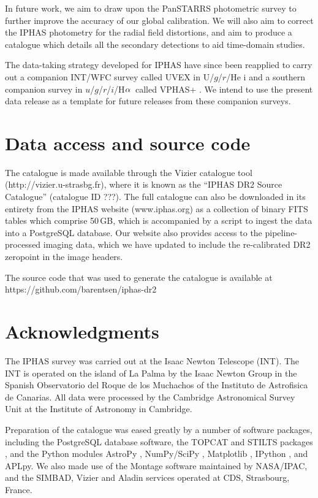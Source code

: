 \documentclass[useAMS,usenatbib]{mn2e}
\def\ha{\mbox{H$\rm \alpha$}}
\begin{document}
In future work, we aim to draw upon the PanSTARRS photometric
survey to further improve the accuracy of our global calibration.
We will also aim to correct the IPHAS photometry for the
radial field distortions,
and aim to produce a catalogue
which details all the secondary detections
to aid time-domain studies.

The data-taking strategy developed for IPHAS
have since been reapplied to carry out a companion INT/WFC survey called UVEX
in U/$g$/$r$/He {\sc i} \citep{Groot2009}
and a southern companion survey in $u$/$g$/$r$/$i$/\ha\ 
called VPHAS+ \citep{Drew2014}.
We intend to use the present data release
as a template for future releases from these companion surveys.

\section*{Data access and source code}
\label{sec:dataaccess}

The catalogue is made available through the Vizier
catalogue tool (http://vizier.u-strasbg.fr),
where it is known as the ``IPHAS DR2 Source Catalogue''
(catalogue ID ???).
The full catalogue can also be downloaded in its entirety
from the IPHAS website (www.iphas.org) as a collection 
of binary FITS tables which comprise 50\,GB,
which is accompanied by a script
to ingest the data into a PostgreSQL database.
Our website also provides access to the pipeline-processed
imaging data, which we have updated to include
the re-calibrated DR2 zeropoint in the image headers.

The source code that was used to generate
the catalogue is available at
https://github.com/barentsen/iphas-dr2

\section*{Acknowledgments}

The IPHAS survey was carried out 
at the Isaac Newton Telescope (INT).
The INT is operated on the island of La Palma
by the Isaac Newton Group
in the Spanish Observatorio del Roque de los Muchachos
of the Instituto de Astrofisica de Canarias.
All data were processed 
by the Cambridge Astronomical Survey Unit
at the Institute of Astronomy in Cambridge.

Preparation of the catalogue was eased greatly
by a number of software packages,
including the PostgreSQL database software,
the TOPCAT and STILTS packages \citep{Taylor2005,Taylor2006},
and the Python modules
AstroPy \citep{Astropy},
NumPy/SciPy \citep{Numpy},
Matplotlib \citep{Matplotlib},
IPython \citep{IPython},
and APLpy.
We also made use of the Montage software maintained by NASA/IPAC,
and the SIMBAD, Vizier and Aladin \citep{Aladin} services
operated at CDS, Strasbourg, France.
\end{document}
